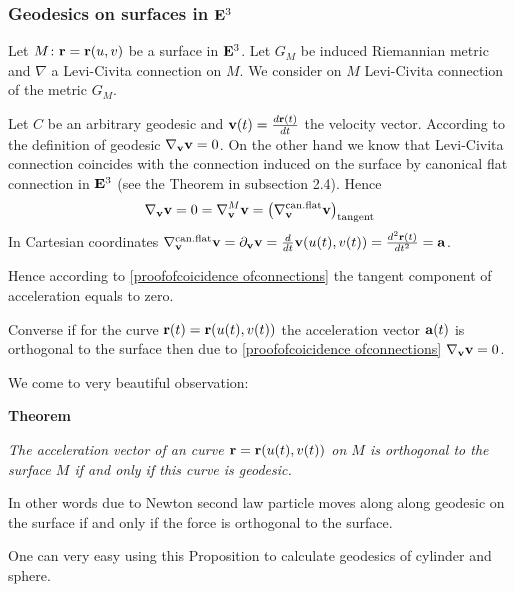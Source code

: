\documentclass[12pt]{article}
\theoremstyle{theorem}
\numberwithin{equation}{section}
\begin{document}



\subsubsection  {Geodesics on surfaces in ${\bf E}^3$}\label{greatcircles}

 Let $M\colon {\bf r}={\bf r}(u,v)$ be a surface in ${\bf E}^3$.  Let $G_M$ be induced Riemannian metric
 and $\nabla$ a Levi-Civita connection on $M$. We consider on $M$ Levi-Civita connection of the metric $G_M$.

  Let $C$ be an arbitrary  geodesic and ${\bf v}(t)={d{\bf r}(t)\over dt}$ the velocity vector.
  According to the definition of geodesic
        $\nabla_{\bf v}{\bf v}=0$. On the other hand we know that Levi-Civita connection
coincides with the connection induced on the surface by canonical flat connection in ${\bf E}^3$
 (see the Theorem in subsection 2.4). Hence
                 \begin{equation}\label{proofofcoicidence ofconnections}
    \nabla_{\bf v}{\bf v}=0=\nabla^M_{\bf v}{\bf v}=\left(\nabla^{\rm can.flat}_{\bf v}{\bf v}\right)_{\rm tangent}
\end{equation}
In Cartesian coordinates  $\nabla^{\rm can.flat}_{\bf v}{\bf v}=\partial_{\bf v} {\bf v}={d\over dt}{\bf v}(u(t),v(t))={d^2{\bf r}(t)\over dt^2}={\bf a}$.

Hence according to \eqref{proofofcoicidence ofconnections} the tangent component of acceleration equals to zero.

Converse if for the curve ${\bf r}(t)={\bf r}(u(t),v(t))$ the acceleration vector ${\bf a}(t)$ is orthogonal to the surface
then due to  \eqref{proofofcoicidence ofconnections} $\nabla_{\bf v}{\bf v}=0$.

We come to very beautiful observation:

{\bf Theorem} {\it The acceleration vector of an curve  ${\bf r}={\bf r}(u(t),v(t))$ on $M$
 is orthogonal to the surface $M$ if and only if this curve is geodesic.

\m

In other words due to Newton second law particle moves along along geodesic on the surface if and only if
the force is
orthogonal to the surface.}

\m


One can very easy using this Proposition to calculate geodesics of cylinder and sphere.
\end{document}
